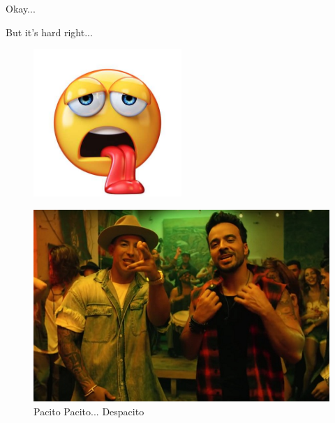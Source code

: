 \documentclass[10pt]{beamer}
\begin{document}
    \begin{frame}
        \begin{Huge}
            Okay...
        \end{Huge}
    \end{frame}

    \begin{frame}
        \begin{Huge}
            But it's hard right...
        \end{Huge}
        \begin{figure}
            \includegraphics[width=0.5\textwidth]{images/tired}
        \end{figure}
    \end{frame}

    \begin{frame}
        \begin{figure}
            \includegraphics[width=1\textwidth]{images/pacito}
            \caption{Pacito Pacito... Despacito}
        \end{figure}
    \end{frame}
\end{document}
